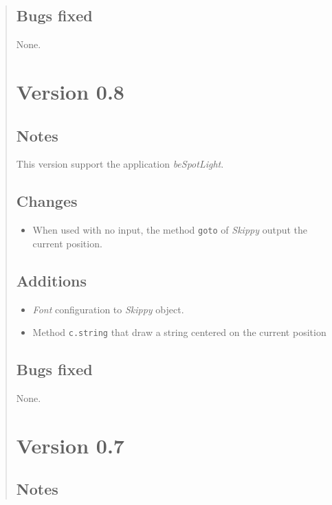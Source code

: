 \documentclass[twoside,10pt,openany]{report}
\begin{document}
\begin{quote}
\subsection{Bugs fixed}

None.

\section{Version 0.8}

\subsection{Notes}

This version support the application {\em beSpotLight}.

\subsection{Changes}

\begin{itemize}
\item When used with no input, the method {\tt goto} of {\it Skippy} output the current position.
\end{itemize}

\subsection{Additions}

\begin{itemize}
\item {\it Font} configuration to {\em Skippy} object.
\item Method {\tt c.string} that draw a string centered on the current position
\end{itemize}

\subsection{Bugs fixed}

None.

\section{Version 0.7}

\subsection{Notes}


\end{quote}
\end{document}
